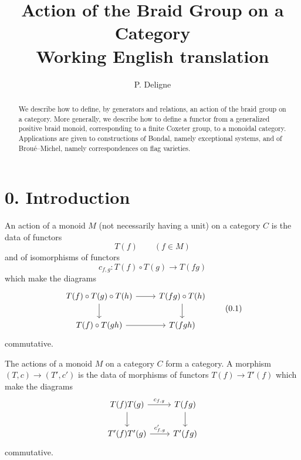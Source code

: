 \documentclass[11pt]{article}
\title{Action of the Braid Group on a Category\\\large Working English translation}
\author{P. Deligne}
\date{}
\begin{document}
\maketitle

\begin{abstract}
We describe how to define, by generators and relations, an action of the braid group on a category. More generally, we describe how to define a functor from a generalized positive braid monoid, corresponding to a finite Coxeter group, to a monoidal category. Applications are given to constructions of Bondal, namely exceptional systems, and of Broué--Michel, namely correspondences on flag varieties.
\end{abstract}

\tableofcontents

\section*{0. Introduction}

An action of a monoid $M$ (not necessarily having a unit) on a category $C$ is the data of functors
\[
T(f) \qquad (f\in M)
\]
and of isomorphisms of functors
\[
c_{f,g}:T(f)\circ T(g)\longrightarrow T(fg)
\]
which make the diagrams
\begin{equation}
\begin{tikzcd}
T(f)\circ T(g)\circ T(h) \arrow[r] \arrow[d] & T(fg)\circ T(h) \arrow[d]\\
T(f)\circ T(gh) \arrow[r] & T(fgh)
\end{tikzcd}\tag{0.1}
\end{equation}
commutative.

The actions of a monoid $M$ on a category $C$ form a category. A morphism $(T,c)\to (T',c')$ is the data of morphisms of functors $T(f)\to T'(f)$ which make the diagrams
\[
\begin{tikzcd}
T(f)T(g) \arrow[r,"c_{f,g}"] \arrow[d] & T(fg) \arrow[d]\\
T'(f)T'(g) \arrow[r,"c'_{f,g}"] & T'(fg)
\end{tikzcd}
\]
commutative.
\end{document}
